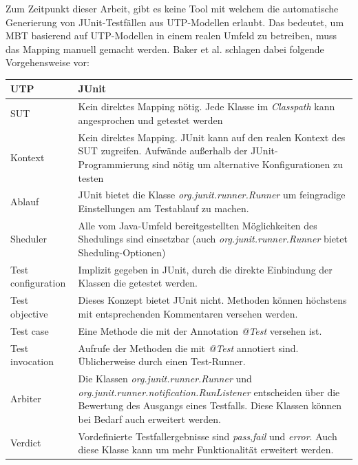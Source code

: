 Zum Zeitpunkt dieser Arbeit, gibt es keine Tool mit welchem die automatische Generierung von JUnit-Testfällen aus UTP-Modellen erlaubt. Das bedeutet, um MBT basierend auf UTP-Modellen in einem realen Umfeld zu betreiben, muss das Mapping manuell gemacht werden. Baker et al. schlagen dabei folgende Vorgehensweise vor\cite{_model-driven_2007}:

\begin{table}[h]

\centering
\begin{tabular}
{ | l |p{9cm}|} \hline
\textbf{UTP} & \textbf{JUnit} \\ \hline
SUT                       & Kein direktes Mapping nötig. Jede Klasse im \textit{Classpath} kann angesprochen und getestet werden   \\ \hline
Kontext                   & Kein direktes Mapping. JUnit kann auf den realen Kontext des SUT zugreifen. Aufwände außerhalb der JUnit-Programmierung sind nötig um alternative Konfigurationen zu testen \\ \hline
Ablauf         			  & JUnit bietet die Klasse \textit{org.junit.runner.Runner} um feingradige Einstellungen am Testablauf zu machen. \\ \hline
Sheduler                  & Alle vom Java-Umfeld bereitgestellten Möglichkeiten des Shedulings sind einsetzbar (auch \textit{org.junit.runner.Runner} bietet Sheduling-Optionen) \\ \hline
Test configuration        & Implizit gegeben in JUnit, durch die direkte Einbindung der Klassen die getestet werden. \\ \hline
Test objective            & Dieses Konzept bietet JUnit nicht. Methoden können höchstens mit entsprechenden Kommentaren versehen werden.\\ \hline
Test case                 & Eine Methode die mit der Annotation \textit{@Test} versehen ist. \\ \hline
Test invocation           & Aufrufe der Methoden die mit \textit{@Test} annotiert sind. Üblicherweise durch einen Test-Runner. \\ \hline
Arbiter                   & Die Klassen \textit{org.junit.runner.Runner} und \textit{org.junit.runner.notification.RunListener} entscheiden über die Bewertung des Ausgangs eines Testfalls. Diese Klassen können bei Bedarf auch erweitert werden. \\ \hline
Verdict                   & Vordefinierte Testfallergebnisse sind \textit{pass},\textit{fail} und \textit{error}. Auch diese Klasse kann um mehr Funktionalität erweitert werden. \\ \hline

\end{tabular}
\end{table}
